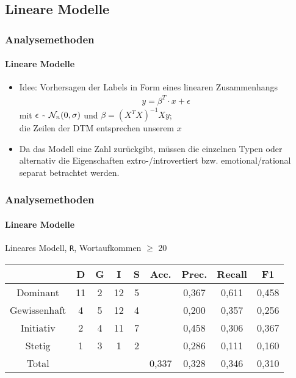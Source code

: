 \subsection{Lineare Modelle}
\begin{frame}
\frametitle{Analysemethoden}
\framesubtitle{Lineare Modelle}
\begin{itemize}\itemsep12pt
\item Idee: Vorhersagen der Labels in Form eines linearen Zusammenhangs 
\begin{align*}
y=\beta^T\cdot x+\epsilon
\end{align*}
mit $\epsilon~\raisebox{-0.9ex}{\~{ }} ~ \mathcal{N}_{n}(0,\sigma)$ und $\beta=(X^TX)^{-1}Xy$;\\
die Zeilen der DTM entsprechen unserem $x$ 
\item Da das Modell eine Zahl zurückgibt, müssen die einzelnen Typen oder alternativ die Eigenschaften extro-/introvertiert bzw. emotional/rational separat betrachtet werden.
\end{itemize}
\end{frame}

\begin{frame}
\frametitle{Analysemethoden}
\framesubtitle{Lineare Modelle}
\begin{center}
Lineares Modell, \texttt{R}, Wortaufkommen $\geq$ 20\\
\bigskip
\begin{tabular}{|c|c|c|c|c|c|c|c|c|}
\hline
				& D 	& G	& I & S	& Acc.	& Prec. & Recall	& F1\\
\hline
Dominant 		& 11	& 2 & 12& 5 &      	& 0,367 & 0,611 	& 0,458\\
Gewissenhaft 	& 4 	& 5 & 12& 4 & 		& 0,200 & 0,357 	& 0,256\\
Initiativ 		& 2 	& 4	& 11& 7	& 		& 0,458	& 0,306 	& 0,367\\
Stetig 			& 1 	& 3 & 1 & 2 & 		& 0,286	& 0,111 	& 0,160\\
\hline
Total 			& 		& 	& 	& 	& 0,337	& 0,328 & 0,346  	& 0,310\\
\hline
\end{tabular}
\end{center}
\end{frame}

